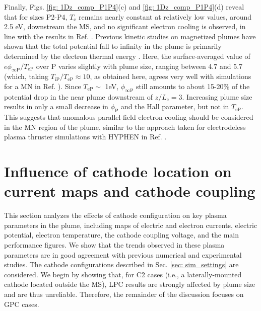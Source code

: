\documentclass[%
 aip,
cha,
 amsmath,amssymb,
 reprint,%
]{revtex4-1}
\begin{document}
Finally, Figs. \ref{fig: 1Dz_comp_P1P4}(c) and \ref{fig: 1Dz_comp_P1P4}(d) reveal that for sizes P2-P4, $T_\mathrm{e}$ remains nearly constant at relatively low values, around 2.5 eV, downstream the MS, and no significant electron cooling is observed, in line with the results in Ref. .
%
Previous kinetic studies on magnetized plumes have shown that the total potential fall to infinity in the plume is primarily determined by the electron thermal energy \cite{ahed20a}. 
%
Here, the surface-averaged value of $e\phi_\mathrm{\infty P}/T_\mathrm{eP}$ over P varies slightly with plume size, ranging between 4.7 and 5.7 
(which, taking $T_\mathrm{iP}/T_\mathrm{eP} \approx 10$, as obtained here, agrees very well with simulations for a MN in Ref. ).
Since $T_\mathrm{eP}\sim$ 1eV,  $\phi_\mathrm{\infty P}$ still amounts to about 15-20\% of the potential drop in the near plume downstream of $z/L_\mathrm{c} = 3$.
%
Increasing plume size results in only a small decrease in $\phi_\mathrm{P}$ and the Hall parameter, but not in $T_\mathrm{eP}$. This suggests that anomalous parallel-field electron cooling \cite{zhou21a} should be considered in the MN region of the plume, similar to the approach taken for electrodeless plasma thruster simulations with HYPHEN in Ref. .



\section{Influence of cathode location on current maps and cathode coupling}\label{sec: cathode location}

This section analyzes the effects of cathode configuration on key plasma parameters in the plume, including maps of electric and electron currents, electric potential, electron temperature, the cathode coupling voltage, and the main performance figures. We show that the trends observed in these plasma parameters are in good agreement with previous numerical and experimental studies.
%
The cathode configurations described in Sec. \ref{sec: sim_settings} are considered. We begin by showing that, for C2 cases (i.e., a laterally-mounted cathode located outside the MS), LPC results are strongly affected by plume size and are thus unreliable. Therefore, the remainder of the discussion focuses on GPC cases.
\end{document}
